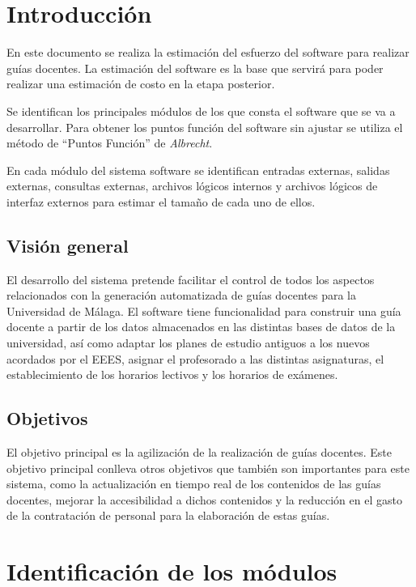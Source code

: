 \documentclass[11pt,a4paper,spanish,twoside]{book}
\begin{document}
\tableofcontents
\listoftables

\chapter*{Introducción}
En este documento se realiza la estimación del esfuerzo del software para
realizar guías docentes. La estimación del software es la base que servirá
para poder realizar una estimación de costo en la etapa posterior.

Se identifican los principales módulos de los que consta el software que se
va a desarrollar. Para obtener los puntos función del software sin ajustar se
utiliza el método de ``Puntos Función'' de \emph{Albrecht}. 

En cada módulo del sistema software se identifican entradas externas, salidas
externas, consultas externas, archivos lógicos internos y archivos lógicos de
interfaz externos para estimar el tamaño de cada uno de ellos. 

\section*{Visión general}
El desarrollo del sistema pretende facilitar el control de todos los aspectos
relacionados con la generación automatizada de guías docentes para la
Universidad de Málaga. El software tiene funcionalidad para construir una
guía docente a partir de los datos almacenados en las distintas bases de
datos de la universidad, así como adaptar los planes de estudio antiguos a
los nuevos acordados por el EEES, asignar el profesorado a las distintas
asignaturas, el establecimiento de los horarios lectivos y los horarios de
exámenes. 

\section*{Objetivos}
El objetivo principal es la agilización de la realización de guías
docentes. Este objetivo principal conlleva otros objetivos que también son
importantes para este sistema, como la actualización en tiempo real de los
contenidos de las guías docentes, mejorar la accesibilidad a dichos
contenidos y la reducción en el gasto de la contratación de personal para la
elaboración de estas guías.

\chapter{Identificación de los módulos}
\end{document}

